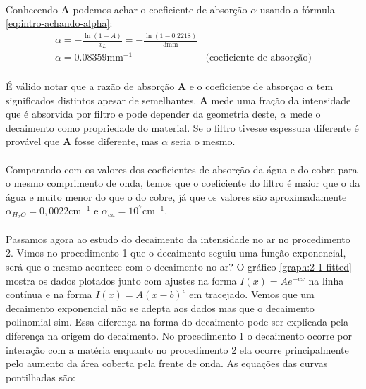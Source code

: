 \documentclass[a4paper,11pt]{article}
\begin{document}
\paragraph{}Conhecendo \textbf{A} podemos achar o coeficiente de absorção $\alpha$ usando a fórmula \ref{eq:intro-achando-alpha}:
\begin{equation}
	\begin{array}{ll}
		\alpha = -\frac{\ln(1 - A)}{x_L} = - \frac{\ln(1 - 0.2218)}{3 \mbox{mm}} & \\
		\alpha = 0.08359 \mbox{mm}^{-1} & \mbox{(coeficiente de absorção)} 
	\end{array}
	\label{eq:1-5}
\end{equation}
\paragraph{} É válido notar que a razão de absorção \textbf{A} e o coeficiente de absorçao $\alpha$ tem significados distintos apesar de semelhantes. \textbf{A} mede uma fração da intensidade que é absorvida por filtro e pode depender da geometria deste, $\alpha$ mede o decaimento como propriedade do material. Se o filtro tivesse espessura diferente é provável que \textbf{A} fosse diferente, mas $\alpha$ seria o mesmo.

\paragraph{}Comparando com os valores dos coeficientes de absorção da água e do cobre para o mesmo comprimento de onda, temos que o coeficiente do filtro é maior que o da água e muito menor do que o do cobre, já que os valores são aproximadamente $\alpha _{H_2 O} = 0,0022 \mbox{cm}^{-1}$ e $\alpha _{cu} = 10^7 \mbox{cm}^{-1}$.

\paragraph{} Passamos agora ao estudo do decaimento da intensidade  no ar no procedimento 2. Vimos no procedimento 1 que o decaimento seguiu uma função exponencial, será que o mesmo acontece com o decaimento no ar? O gráfico \ref{graph:2-1-fitted} mostra os dados plotados junto com ajustes na forma $I(x) = Ae^{-cx}$ na linha contínua e na forma $I(x) = A(x - b)^{c}$ em tracejado. Vemos que um decaimento exponencial não se adepta aos dados mas que o decaimento polinomial sim. Essa diferença na forma do decaimento pode ser explicada pela diferença na origem do decaimento. No procedimento 1 o decaimento ocorre por interação com a matéria enquanto no procedimento 2 ela ocorre principalmente pelo aumento da área coberta pela frente de onda. As equações das curvas pontilhadas são:
\end{document}
